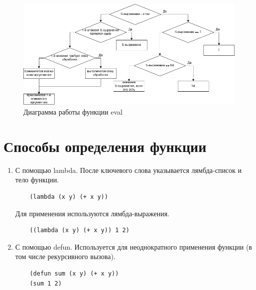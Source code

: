 \documentclass[14pt,a4paper]{scrreprt}
\begin{document}
\begin{figure}[H]
	\begin{center}
		\includegraphics[scale=0.5]{assets/scheme.png}
	\end{center}
	\caption{Диаграмма работы функции eval}
\end{figure}


\section{Способы определения функции}

\begin{enumerate}
	\item С помощью lambda. После ключевого слова указывается лямбда-список и тело функции. 
	\begin{lstlisting}
	(lambda (x y) (+ x y))
	\end{lstlisting}
	Для применения используются лямбда-выражения.
	\begin{lstlisting}
	((lambda (x y) (+ x y)) 1 2)
	\end{lstlisting}
	\item С помощью defun. Используется для неоднократного применения функции (в том числе рекурсивного вызова).
	\begin{lstlisting}
	(defun sum (x y) (+ x y))
	(sum 1 2)
	\end{lstlisting}
\end{enumerate}
\end{document}
